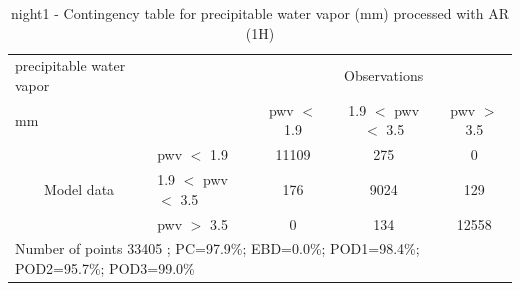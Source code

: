 \begin{table}[p!]
\begin{center}
\begin{tabular}{llccc}
\hline
{precipitable water vapor}                                       &                                                    & \multicolumn{3}{c}{Observations}                 \\
{mm}                                       &                             & pwv $<$ 1.9   & 1.9 $<$ pwv $<$ 3.5 & pwv $>$ 3.5 \\
\hline
\multicolumn{1}{c}{\multirow{3}{*}{Model data}}  & pwv $<$ 1.9             & 11109                & 275                       & 0              \\
                                                 & 1.9  $<$ pwv $<$ 3.5 & 176                & 9024                       & 129              \\
                                                 & pwv $>$ 3.5             & 0                & 134                       & 12558              \\
\hline 
\multicolumn{5}{l}{ Number of points        33405 ; PC=97.9\%; EBD=0.0\%; POD1=98.4\%; POD2=95.7\%; POD3=99.0\%}
\end{tabular}
\end{center}
\caption{night1 - Contingency table for  precipitable water vapor (mm) processed with AR (1H)  }
\label{tab:contingencypwvAFT:night1}
\end{table}
